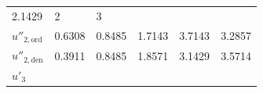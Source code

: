 \begin{longtable}[]{@{}llllll@{}}
\begin{minipage}[t]{0.20\columnwidth}
2.1429\strut
\end{minipage} & \begin{minipage}[t]{0.17\columnwidth}\raggedright
2\strut
\end{minipage} & \begin{minipage}[t]{0.17\columnwidth}\raggedright
3\strut
\end{minipage}\tabularnewline
\begin{minipage}[t]{0.15\columnwidth}\raggedright
\(u''_{2,\text{ord}}\)\strut
\end{minipage} & \begin{minipage}[t]{0.08\columnwidth}\raggedright
0.6308\strut
\end{minipage} & \begin{minipage}[t]{0.07\columnwidth}\raggedright
0.8485\strut
\end{minipage} & \begin{minipage}[t]{0.20\columnwidth}\raggedright
1.7143\strut
\end{minipage} & \begin{minipage}[t]{0.17\columnwidth}\raggedright
3.7143\strut
\end{minipage} & \begin{minipage}[t]{0.17\columnwidth}\raggedright
3.2857\strut
\end{minipage}\tabularnewline
\begin{minipage}[t]{0.15\columnwidth}\raggedright
\(u''_{2,\text{den}}\)\strut
\end{minipage} & \begin{minipage}[t]{0.08\columnwidth}\raggedright
0.3911\strut
\end{minipage} & \begin{minipage}[t]{0.07\columnwidth}\raggedright
0.8485\strut
\end{minipage} & \begin{minipage}[t]{0.20\columnwidth}\raggedright
1.8571\strut
\end{minipage} & \begin{minipage}[t]{0.17\columnwidth}\raggedright
3.1429\strut
\end{minipage} & \begin{minipage}[t]{0.17\columnwidth}\raggedright
3.5714\strut
\end{minipage}\tabularnewline
\begin{minipage}[t]{0.15\columnwidth}\raggedright
\(u'_3\)\strut
\end{minipage} & \begin{minipage}[t]{0.08\columnwidth}\raggedright

\end{minipage}
\end{longtable}
